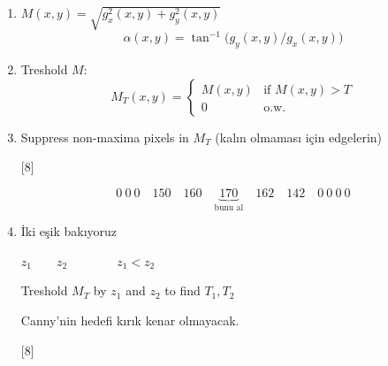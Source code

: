 \documentclass[11pt,a4paper]{article}
\begin{document}
\begin{enumerate}[label=\arabic*., start=2, leftmargin=*]
\item $\displaystyle M(x,y)=\sqrt{g_x^2(x,y)+g_y^2(x,y)}$
\[ \alpha(x,y)=\tan^{-1}\bigl(g_y(x,y)/g_x(x,y)\bigr) \]
\item Treshold $M$:
\[ M_T(x,y)=\begin{cases} M(x,y) & \text{if } M(x,y)>T\\ 0 & \text{o.w.}\end{cases} \]
\item Suppress non-maxima pixels in $M_T$ \quad (kalın olmaması için edgelerin)

[8]

\[ 0\ 0\ 0 \quad 150 \quad 160 \quad \underbrace{170}_{\text{bunu al}} \quad 162 \quad 142 \quad 0\ 0\ 0\ 0 \]
\item İki eşik bakıyoruz

$z_1 \qquad z_2 \qquad\qquad z_1<z_2$

Treshold $M_T$ by $z_1$ and $z_2$ to find $T_1, T_2$

Canny'nin hedefi kırık kenar olmayacak.

[8]
\end{enumerate}
\end{document}
